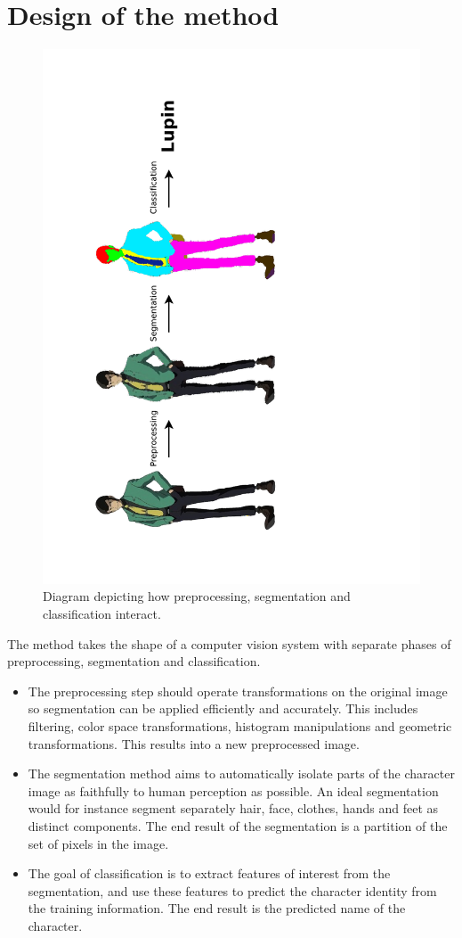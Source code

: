 \section{Design of the method}

\begin{figure}[htb!]
\centerline{
\includegraphics[height=1.2\textwidth,angle=270,clip=true,trim=0 0 6cm 0]{images/visionSystemDiagram.pdf}
}
\caption{Diagram depicting how preprocessing, segmentation and classification interact.}
\end{figure}

The method takes the shape of a computer vision system with separate phases of preprocessing, segmentation and classification.

\begin{itemize}
\item The preprocessing step should operate transformations on the original image so segmentation can be applied efficiently and accurately. This includes filtering, color space transformations, histogram manipulations and geometric transformations. This results into a new preprocessed image.
\item The segmentation method aims to automatically isolate parts of the character image as faithfully to human perception as possible. An ideal segmentation would for instance segment separately hair, face, clothes, hands and feet as distinct components.
The end result of the segmentation is a partition of the set of pixels in the image.
\item The goal of classification is to extract features of interest from the segmentation, and use these features to predict the character identity from the training information. The end result is the predicted name of the character.
\end{itemize}

